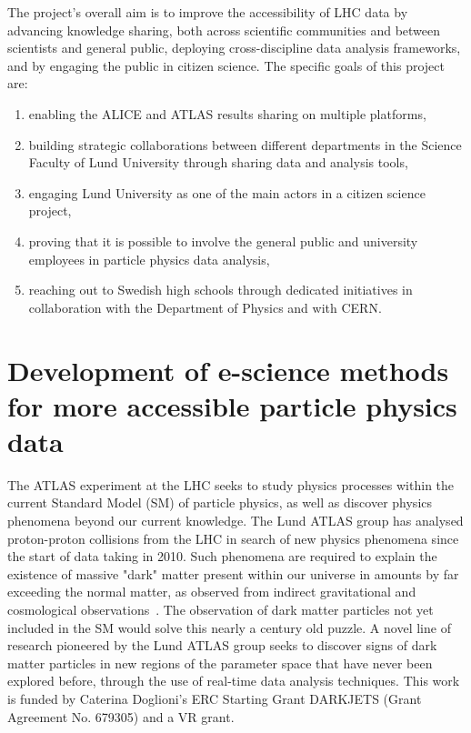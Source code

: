 \documentclass[a4paper,justified]{tufte-handout}
\begin{document}
The project's overall aim is to improve the accessibility of LHC data by advancing knowledge sharing, both across scientific communities and between scientists and general public, deploying cross-discipline data analysis frameworks, and by engaging the public in citizen science. The specific goals of this project are: 
\begin{enumerate}
\itemsep0em
\item enabling the ALICE and ATLAS results sharing on multiple platforms, %
\item building strategic collaborations between different departments in the Science Faculty of Lund University through sharing data and analysis tools, %
\item engaging Lund University as one of the main actors in a citizen science project, %
\item proving that it is possible to involve the general public and university employees in particle physics data analysis, %
\item reaching out to Swedish high schools through dedicated initiatives in collaboration with the Department of Physics and with CERN.%
\end{enumerate}

\section{Development of e-science methods for more accessible particle physics data}\label{sec:methods}
\vspace{-10px}

The ATLAS experiment at the LHC seeks to study physics processes within the current Standard Model (SM) of particle physics, as well as discover physics phenomena beyond our current knowledge. The Lund ATLAS group has analysed proton-proton collisions from the LHC in search of new physics phenomena since the start of data taking in 2010. Such phenomena are required to explain the existence of massive "dark" matter present within our universe in amounts by far exceeding the normal matter, as observed from indirect gravitational and cosmological observations~\cite{Bertone:2004pz}. 
The observation of dark matter particles not yet included in the SM would solve this nearly a century old puzzle. A novel line of research pioneered by the Lund ATLAS group seeks to discover signs of dark matter particles in new regions of the parameter space that have never been explored before, through the use of real-time data analysis techniques. This work is funded by Caterina Doglioni's ERC Starting Grant DARKJETS (Grant Agreement No. 679305) and a VR grant.
\end{document}
